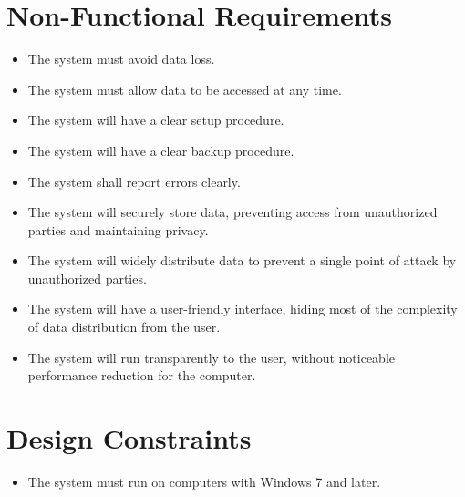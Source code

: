 \section {Non-Functional Requirements}
	\begin{itemize}
		\item The system must avoid data loss.

		\item The system must allow data to be accessed at any time.

		\item The system will have a clear setup procedure.
		
		\item The system will have a clear backup procedure.
		
		\item The system shall report errors clearly.

		\item The system will securely store data, preventing access from unauthorized parties and maintaining privacy.

		\item The system will widely distribute data to prevent a single point of attack by unauthorized parties.

		\item The system will have a user-friendly interface, hiding most of the complexity of data distribution from the user.

		\item The system will run transparently to the user, without noticeable performance reduction for the computer.
	\end{itemize}

\section {Design Constraints}
	\begin{itemize}
		\item The system must run on computers with Windows 7 and later.

		
	\end{itemize}